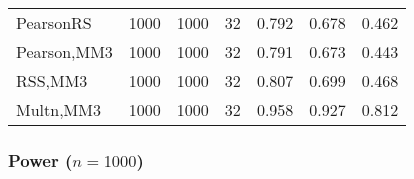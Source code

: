 \documentclass[
]{article}
\begin{document}
\begin{table}[H]
{\begin{tabular}[t]{lrrrrrr}
\hspace{1em}PearsonRS & 1000 & 1000 & 32 & 0.792 & 0.678 & 0.462\\
\hspace{1em}Pearson,MM3 & 1000 & 1000 & 32 & 0.791 & 0.673 & 0.443\\
\hspace{1em}RSS,MM3 & 1000 & 1000 & 32 & 0.807 & 0.699 & 0.468\\
\hspace{1em}Multn,MM3 & 1000 & 1000 & 32 & 0.958 & 0.927 & 0.812\\
\bottomrule
\end{tabular}}
\end{table}

\hypertarget{power-n1000-1}{%
\subsubsection{\texorpdfstring{Power
(\(n=1000\))}{Power (n=1000)}}\label{power-n1000-1}}
\end{document}
